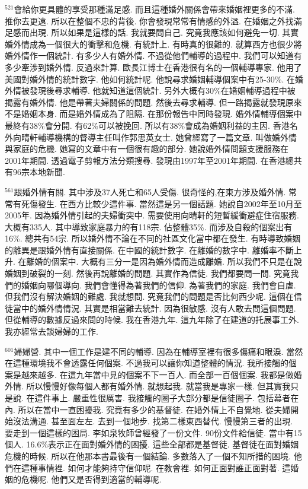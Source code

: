 \documentclass{book}
\begin{document}
$^{521}$會給你更具體的享受那種滿足感.
而且這種婚外關係會帶來婚姻裡更多的不滿.
推你去更遠.
所以在整個不忠的背後.
你會發現常常有情感的外溢.
在婚姻之外找滿足感而出現.
所以如果是這樣的話.
我就要問自己.
究竟我應該如何避免一切.
其實婚外情成為一個很大的衝擊和危機.
有統計上.
有時真的很難的.
就算西方也很少將婚外情作一個統計.
有多少人有婚外情.
不過從他們輔導的過程中.
我們可以知道有多少牽涉到婚外情.
反過來計算.
歐長江博士在香港很有名的一個輔導專家.
他用了美國對婚外情的統計數字.
他如何統計呢.
他說尋求婚姻輔導個案中有25-30\%.
在婚外情被發現後尋求輔導.
他就知道這個統計.
另外大概有30\%在婚姻輔導過程中被揭露有婚外情.
他是帶著夫婦關係的問題.
然後去尋求輔導.
但一路揭露就發現原來不是婚姻本身.
而是婚外情成為了阻隔.
在那份報告中同時發現.
婚外情輔導個案中最終有38\%會分開.
有62\%可以被挽回.
所以有38\%會成為婚姻利益的主因.
香港名外向晴軒輔導機構的督導主任叫作郭思英女士.
她曾經寫了一篇文章.
叫做婚外情與家庭的危機.
她寫的文章中有一個很有趣的部分.
她說婚外情問題支援服務在2001年期間.
透過電子剪報方法分類搜尋.
發現由1997年至2001年期間.
在香港總共有96宗本地新聞.

$^{561}$跟婚外情有關.
其中涉及37人死亡和65人受傷.
很奇怪的,在東方涉及婚外情.
常常有死傷發生.
在西方比較少這件事.
當然這是另一個話題.
她說自2002年至10月至2005年.
因為婚外情引起的夫婦衝突中.
需要使用向晴軒的短暫緩衝避症住宿服務.
大概有335人.
其中導致家庭暴力的有118宗.
佔整體35\%.
而涉及自殺的個案出有16\%.
總共有54宗.
所以婚外情不論在不同的社區文化當中都在發生.
有時導致婚姻的離異是跟婚外情有直接關係.
在中國的統計數字.
在離婚的數字中.
離婚率不斷上升.
在離婚的個案中.
大概有三分一是因為婚外情而造成離婚.
所以我們不只是在說婚姻到破裂的一刻.
然後再說離婚的問題.
其實作為信徒.
我們都要問一問.
究竟我們的婚姻向哪個導向.
我們會懂得為著我們的信仰.
為著我們的家庭.
我們會自虐.
但我們沒有解決婚姻的難處.
我就想問.
究竟我們的問題是否比何西少呢.
這個在信徒當中的婚外情情況.
其實是相當難去統計.
因為很敏感.
沒有人敢去問這個問題.
但從輔導的數據反過來問的時候.
我在香港九年.
這九年除了在建道的托展事工外.
我亦經常去談婦婦的工作.

$^{601}$婦婦營.
其中一個工作是建不同的輔導.
因為在輔導室裡有很多傷痛和眼淚.
當然在這種環境我不會透露任何個案.
不過我可以讓你知道整體的情況.
我所接觸的個案是越來越多.
在這九年當中見的個案不下一百人.
而全部一百個個案.
我都是做婚外情.
所以慢慢好像每個人都有婚外情.
就想起我.
就當我是專家一樣.
但其實我只是說.
在這件事上.
嚴重性很厲害.
我接觸的圈子大部分都是信徒圈子.
包括幕者在內.
所以在當中一直困擾我.
究竟有多少的基督徒.
在婚外情上不自覺地.
從夫婦開始沒法溝通.
甚至面左左.
去到一個地步.
找第二樣東西替代.
慢慢第三者的出現.
要走到一個這樣的困局.
李如泉牧師曾經發了一份文件.
90份文件給信徒.
當中有15個人.
16.6\%表示正在面對婚外情的困擾.
這些全部都是基督徒.
基督徒在面對婚姻危機的時候.
所以在他那本書最後有一個結論.
多數落入了一個不知所措的困境.
他們在這種事情裡.
如何才能夠持守信仰呢.
在教會裡.
如何正面對誰正面對著.
這婚姻的危機呢.
他們又是否得到適當的輔導呢.
\end{document}
